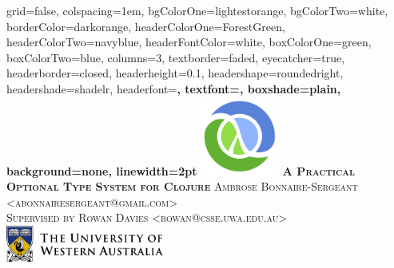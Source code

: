 \documentclass[landscape,final,a0paper,fontscale=0.277]{baposter}
\begin{document}
\begin{poster}%
  {
  grid=false,
  colspacing=1em,
  bgColorOne=lightestorange,
  bgColorTwo=white,
  borderColor=darkorange,
  headerColorOne=ForestGreen,
  headerColorTwo=navyblue,
  headerFontColor=white,
  boxColorOne=green,
  boxColorTwo=blue,
  columns=3,
  textborder=faded,
  eyecatcher=true,
  headerborder=closed,
  headerheight=0.1\textheight,
  headershape=roundedright,
  headershade=shadelr,
  headerfont=\Large\bf\textsc, %
  textfont={\setlength{\parindent}{1.5em}},
  boxshade=plain,
  background=none,
  linewidth=2pt
  }
  {\includegraphics[height=7em]{images/clojure-logo10.png}} 
  {\bf\textsc{A Practical Optional Type System for Clojure}}
  { \textsc{Ambrose Bonnaire-Sergeant <abonnairesergeant@gmail.com>}
    \\
    \textsc{{Supervised by Rowan Davies <rowan@csse.uwa.edu.au>}}}
  {%
    \includegraphics[width=14em]{images/UWA_logo.png}
  }
%
%   


\end{poster}
\end{document}
